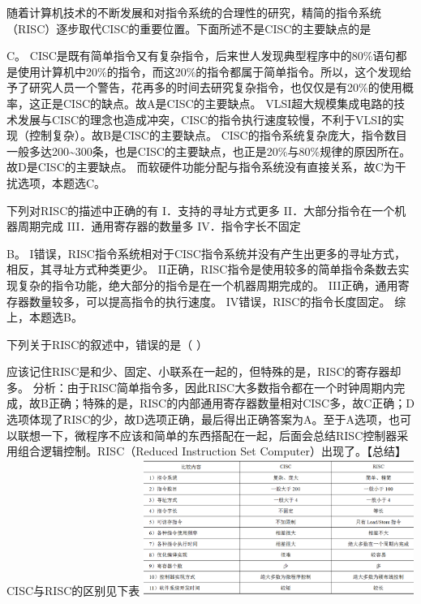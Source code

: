 \question 随着计算机技术的不断发展和对指令系统的合理性的研究，精简的指令系统（RISC）逐步取代CISC的重要位置。下面所述不是CISC的主要缺点的是
\par{}
\begin{solution}C。
CISC是既有简单指令又有复杂指令，后来世人发现典型程序中的80\%语句都是使用计算机中20\%的指令，而这20\%的指令都属于简单指令。所以，这个发现给予了研究人员一个警告，花再多的时间去研究复杂指令，也仅仅是有20\%的使用概率，这正是CISC的缺点。故A是CISC的主要缺点。
VLSI超大规模集成电路的技术发展与CISC的理念也造成冲突，CISC的指令执行速度较慢，不利于VLSI的实现（控制复杂）。故B是CISC的主要缺点。
CISC的指令系统复杂庞大，指令数目一般多达200\textasciitilde{}300条，也是CISC的主要缺点，也正是20\%与80\%规律的原因所在。故D是CISC的主要缺点。
而软硬件功能分配与指令系统没有直接关系，故C为干扰选项，本题选C。
\end{solution}
\question 下列对RISC的描述中正确的有 I．支持的寻址方式更多
II．大部分指令在一个机器周期完成 III．通用寄存器的数量多
IV．指令字长不固定
\par{}
\begin{solution}B。
I错误，RISC指令系统相对于CISC指令系统并没有产生出更多的寻址方式，相反，其寻址方式种类更少。
II正确，RISC指令是使用较多的简单指令条数去实现复杂的指令功能，绝大部分的指令是在一个机器周期完成的。
III正确，通用寄存器数量较多，可以提高指令的执行速度。
IV错误，RISC的指令长度固定。 综上，本题选B。
\end{solution}
\question 下列关于RISC的叙述中，错误的是（ ）
\par{}
\begin{solution}应该记住RISC是和少、固定、小联系在一起的，但特殊的是，RISC的寄存器却多。
分析：由于RISC简单指令多，因此RISC大多数指令都在一个时钟周期内完成，故B正确；特殊的是，RISC的内部通用寄存器数量相对CISC多，故C正确；D选项体现了RISC的少，故D选项正确，最后得出正确答案为A。至于A选项，也可以联想一下，微程序不应该和简单的东西搭配在一起，后面会总结RISC控制器采用组合逻辑控制。RISC（Reduced
Instruction Set Computer）出现了。【总结】 CISC与RISC的区别见下表
\includegraphics[width=3.46875in,height=1.73958in]{computerassets/8FD01177EADF3DDAF05DC032D8C42EE6.png}
\end{solution}
